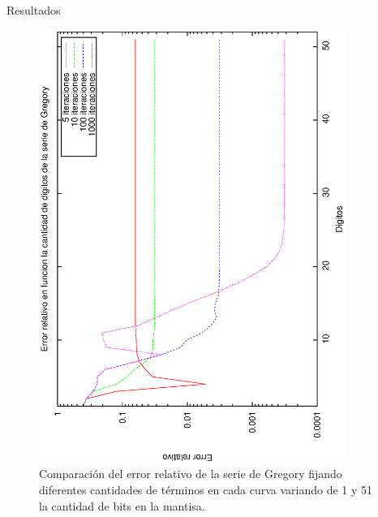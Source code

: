 \begin{section}{Resultados}
	\begin{figure}[H]
	  \centering
		\includegraphics[width=10cm,angle=-90]{graficos/gregory_1a51p.eps}
	  \caption{Comparación del error relativo de la serie de Gregory fijando diferentes cantidades de términos en cada curva variando de 1 y 51 la cantidad de bits en la mantisa.}
	  \label{fig:gregory_51p}
	\end{figure}
	
	\VSP
	

\end{section}
